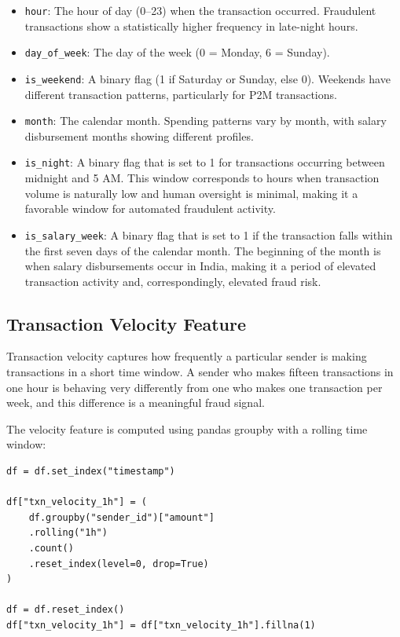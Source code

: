 \begin{itemize}
    \item \texttt{hour}: The hour of day (0--23) when the transaction occurred. Fraudulent transactions show a statistically higher frequency in late-night hours.
    \item \texttt{day\_of\_week}: The day of the week (0 = Monday, 6 = Sunday).
    \item \texttt{is\_weekend}: A binary flag (1 if Saturday or Sunday, else 0). Weekends have different transaction patterns, particularly for P2M transactions.
    \item \texttt{month}: The calendar month. Spending patterns vary by month, with salary disbursement months showing different profiles.
    \item \texttt{is\_night}: A binary flag that is set to 1 for transactions occurring between midnight and 5 AM. This window corresponds to hours when transaction volume is naturally low and human oversight is minimal, making it a favorable window for automated fraudulent activity.
    \item \texttt{is\_salary\_week}: A binary flag that is set to 1 if the transaction falls within the first seven days of the calendar month. The beginning of the month is when salary disbursements occur in India, making it a period of elevated transaction activity and, correspondingly, elevated fraud risk.
\end{itemize}

\subsection{Transaction Velocity Feature}

\label{sec:velocity}

Transaction velocity captures how frequently a particular sender is making transactions in a short time window. A sender who makes fifteen transactions in one hour is behaving very differently from one who makes one transaction per week, and this difference is a meaningful fraud signal.

The velocity feature is computed using pandas groupby with a rolling time window:

\begin{lstlisting}[caption={Transaction velocity computation using rolling window}, label={lst:velocity}]
df = df.set_index("timestamp")

df["txn_velocity_1h"] = (
    df.groupby("sender_id")["amount"]
    .rolling("1h")
    .count()
    .reset_index(level=0, drop=True)
)

df = df.reset_index()
df["txn_velocity_1h"] = df["txn_velocity_1h"].fillna(1)
\end{lstlisting}


